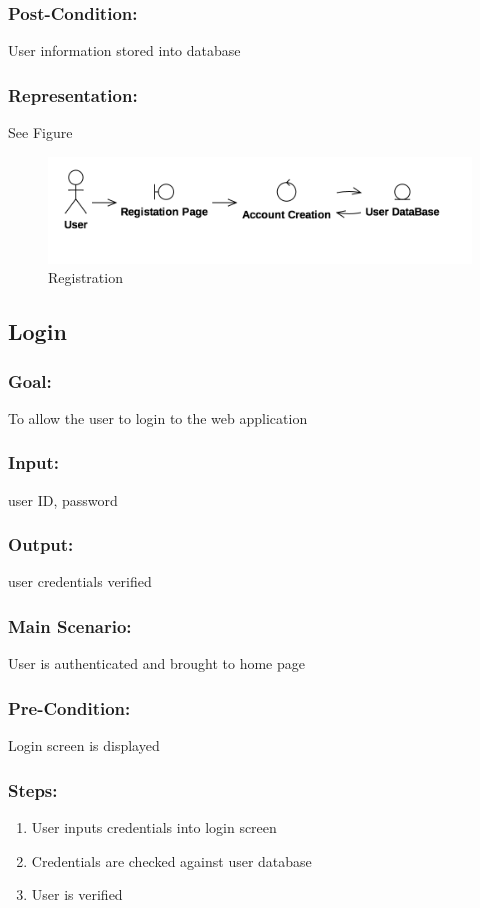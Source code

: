 	\subsubsection{Post-Condition:} User information stored into database
	\subsubsection{Representation:} See Figure~\thesubsection
	\begin{figure}[p]
	\centering
	\includegraphics[width=\textwidth]{registration.png}
	\caption{Registration}
	\end{figure}
	\subsection{Login}
		\subsubsection{Goal:} To allow the user to login to the web application  
		\subsubsection{Input:} user ID, password
		\subsubsection{Output:} user credentials verified
		\subsubsection{Main Scenario:} User is authenticated and brought to home page
		\subsubsection{Pre-Condition:} Login screen is displayed
		\subsubsection{Steps:} 
		\begin{enumerate}
			\item User inputs credentials into login screen
			\item Credentials are checked against user database
			\item User is verified
		\end{enumerate}
